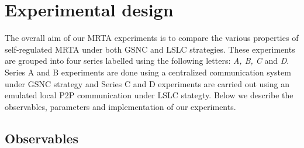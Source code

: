 \documentclass[journal]{IEEEtran}
\begin{document}
\section{Experimental design}
\label{sec:expt-design}
The overall aim of our MRTA experiments is to compare the various properties of self-regulated MRTA under both GSNC and LSLC strategies. These experiments are grouped into four series labelled using the following letters: \textit{A, B, C} and \textit{D}. Series A and B experiments are done using a centralized communication system under GSNC strategy and Series C and D experiments are carried out using an emulated local P2P communication under LSLC stategty. Below we describe the observables, parameters and implementation of our experiments.
\subsection{Observables}
%
%
\end{document}
